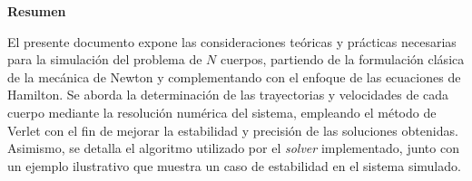 



\usepackage{graphicx}



\onecolumn{}

\begin{center} \Large \textbf{Resumen} \end{center}
El presente documento expone las consideraciones teóricas y prácticas necesarias para la simulación del problema de \(N\) cuerpos, partiendo de la formulación clásica de la mecánica de Newton y complementando con el enfoque de las ecuaciones de Hamilton. Se aborda la determinación de las trayectorias y velocidades de cada cuerpo mediante la resolución numérica del sistema, empleando el método de Verlet con el fin de mejorar la estabilidad y precisión de las soluciones obtenidas. Asimismo, se detalla el algoritmo utilizado por el \textit{solver} implementado, junto con un ejemplo ilustrativo que muestra un caso de estabilidad en el sistema simulado.




